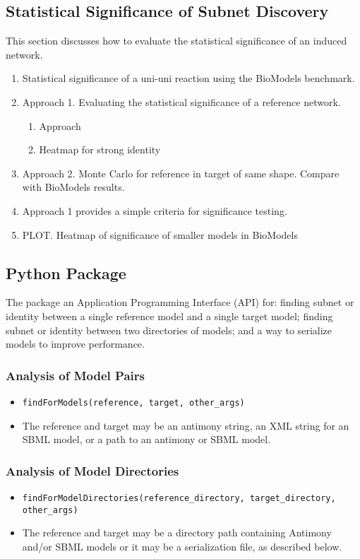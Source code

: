 \documentclass{article}
\begin{document}
\subsection{Statistical Significance of Subnet Discovery}
This section discusses how to evaluate the statistical significance of an induced network.
\begin{enumerate}
    \item Statistical significance of a uni-uni reaction using the BioModels benchmark.
    \item Approach 1. Evaluating the statistical significance of a reference
    network.
    \begin{enumerate}
        \item Approach
        \item Heatmap for strong identity
    \end{enumerate}
    \item Approach 2. Monte Carlo for reference in target of same shape. Compare with BioModels results.
    \item Approach 1 provides a simple criteria for significance testing.
    \item PLOT. Heatmap of significance of smaller models in BioModels
\end{enumerate}



\subsection{Python Package}

The package an Application Programming Interface (API) for: finding subnet or identity between a single reference model and a single target model; finding subnet or identity between two directories of models; and a way to serialize models to improve performance.

\subsubsection{Analysis of Model Pairs}
\begin{itemize}
    \item \texttt{findForModels(reference, target, other\_args)}
    \item
    The reference and target may be an antimony string, an XML string for an SBML model, or a path to an antimony or SBML model.
\end{itemize}

\subsubsection{Analysis of Model Directories}
\begin{itemize}
    \item \texttt{findForModelDirectories(reference\_directory, target\_directory, other\_args)}
    \item
    The reference and target may be a directory path containing Antimony and/or SBML models or it may be a serialization file, as described below.
\end{itemize}
\end{document}
